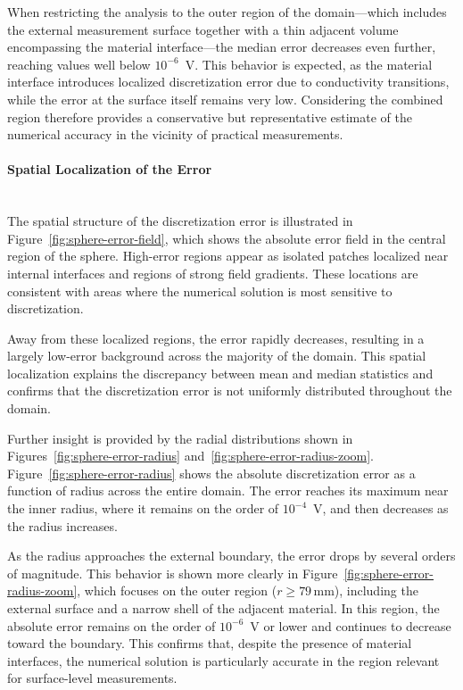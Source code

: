 \documentclass[../00_Main.tex]{subfiles}
\begin{document}
When restricting the analysis to the outer region of the domain---which includes the external measurement surface together with a thin adjacent volume encompassing the material interface---the median error decreases even further, reaching values well below $10^{-6}$~V. This behavior is expected, as the material interface introduces localized discretization error due to conductivity transitions, while the error at the surface itself remains very low. Considering the combined region therefore provides a conservative but representative estimate of the numerical accuracy in the vicinity of practical measurements.

\paragraph*{Spatial Localization of the Error}\\

The spatial structure of the discretization error is illustrated in Figure~\ref{fig:sphere-error-field}, which shows the absolute error field in the central region of the sphere. High-error regions appear as isolated patches localized near internal interfaces and regions of strong field gradients. These locations are consistent with areas where the numerical solution is most sensitive to discretization.

Away from these localized regions, the error rapidly decreases, resulting in a largely low-error background across the majority of the domain. This spatial localization explains the discrepancy between mean and median statistics and confirms that the discretization error is not uniformly distributed throughout the domain.

Further insight is provided by the radial distributions shown in Figures~\ref{fig:sphere-error-radius} and~\ref{fig:sphere-error-radius-zoom}. Figure~\ref{fig:sphere-error-radius} shows the absolute discretization error as a function of radius across the entire domain. The error reaches its maximum near the inner radius, where it remains on the order of $10^{-4}$~V, and then decreases as the radius increases. 

As the radius approaches the external boundary, the error drops by several orders of magnitude. This behavior is shown more clearly in Figure~\ref{fig:sphere-error-radius-zoom}, which focuses on the outer region ($r \geq 79\,\mathrm{mm}$), including the external surface and a narrow shell of the adjacent material. In this region, the absolute error remains on the order of $10^{-6}$~V or lower and continues to decrease toward the boundary. This confirms that, despite the presence of material interfaces, the numerical solution is particularly accurate in the region relevant for surface-level measurements.
\end{document}
